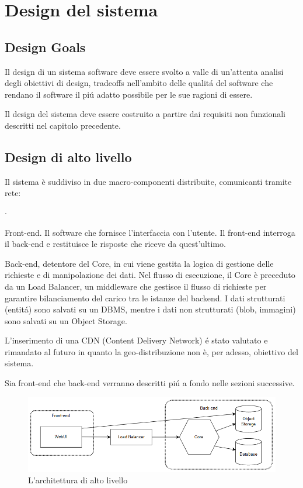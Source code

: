 \chapter{Design del sistema}

\section{Design Goals}
Il design di un sistema software deve essere svolto a valle di un'attenta 
analisi degli obiettivi di design, tradeoffs nell'ambito delle qualitá del 
software che rendano il software il piú adatto possibile per le sue ragioni 
di essere.

Il design del sistema deve essere costruito a partire dai requisiti non funzionali
descritti nel capitolo precedente.

\section{Design di alto livello}
Il sistema è suddiviso in due macro-componenti distribuite, comunicanti tramite 
rete:
\begin{list}{$\cdot$}{}
    \item Front-end. Il software che fornisce l'interfaccia con l'utente. Il front-end 
    interroga il back-end e restituisce le risposte che riceve da quest'ultimo.
    \item Back-end, detentore del Core, in cui viene gestita la logica di gestione delle 
    richieste e di manipolazione dei dati. Nel flusso di esecuzione, il Core è preceduto 
    da un Load Balancer, un middleware che gestisce il flusso di richieste per garantire 
    bilanciamento del carico tra le istanze del backend. I dati strutturati (entitá) sono 
    salvati su un DBMS, mentre i dati non strutturati (blob, immagini) sono salvati su un 
    Object Storage.
\end{list}

L'inserimento di una CDN (Content Delivery Network) é stato valutato e rimandato al 
futuro in quanto la geo-distribuzione non è, per adesso, obiettivo del sistema.

Sia front-end che back-end verranno descritti piú a fondo nelle sezioni successive.

\begin{figure}[H]
    \centering
    \includegraphics[width=\textwidth]{assets/diagrams/high-level-arch.png}
    \caption{L'architettura di alto livello}
    \label{fig:Architettura di alto livello}
\end{figure}

